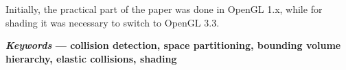 Initially, the practical part of the paper was done in OpenGL 1.x, while for shading it was necessary to switch to OpenGL 3.3. 

\vspace{5pt}
%
\noindent \textbf{\textit{Keywords} --- collision detection, space partitioning, bounding volume hierarchy, elastic collisions, shading}


